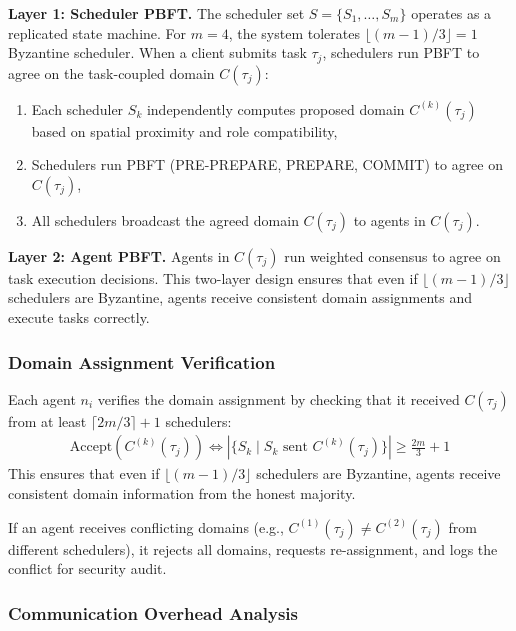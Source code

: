 \documentclass[lettersize,journal]{IEEEtran}
\begin{document}
\textbf{Layer 1: Scheduler PBFT.} The scheduler set $S = \{S_1, \ldots, S_m\}$
operates as a replicated state machine. For $m = 4$, the system tolerates
$\lfloor (m-1)/3 \rfloor = 1$ Byzantine scheduler. When a client submits task $\tau_j$,
schedulers run PBFT to agree on the task-coupled domain $C(\tau_j)$:
\begin{enumerate}
\item Each scheduler $S_k$ independently computes proposed domain
$C^{(k)}(\tau_j)$ based on spatial proximity and role compatibility,
\item Schedulers run PBFT (PRE-PREPARE, PREPARE, COMMIT) to agree on
$C(\tau_j)$,
\item All schedulers broadcast the agreed domain $C(\tau_j)$ to
agents in $C(\tau_j)$.
\end{enumerate}

\textbf{Layer 2: Agent PBFT.} Agents in $C(\tau_j)$ run weighted consensus to agree on task execution decisions.
This two-layer design ensures that even if $\lfloor (m-1)/3 \rfloor$ schedulers are Byzantine,
agents receive consistent domain assignments and execute tasks correctly.

\subsubsection{Domain Assignment Verification}
\label{sec:domain_verification}

Each agent $n_i$ verifies the domain assignment by checking
that it received $C(\tau_j)$ from at least $\lceil 2m/3 \rceil + 1$ schedulers:
\begin{equation}
\begin{aligned}
\text{Accept}(C^{(k)}(\tau_j)) \iff
|\{S_k \mid S_k \text{ sent } C^{(k)}(\tau_j)\}| \geq \frac{2m}{3} + 1
\label{eq:domain_verification}
\end{aligned}
\end{equation}
This ensures that even if $\lfloor (m-1)/3 \rfloor$ schedulers are Byzantine, agents receive
consistent domain information from the honest majority.

If an agent receives conflicting domains (e.g., $C^{(1)}(\tau_j) \neq C^{(2)}(\tau_j)$
from different schedulers), it rejects all domains, requests re-assignment,
and logs the conflict for security audit.

\subsubsection{Communication Overhead Analysis}
\label{sec:scheduler_overhead}
\end{document}
